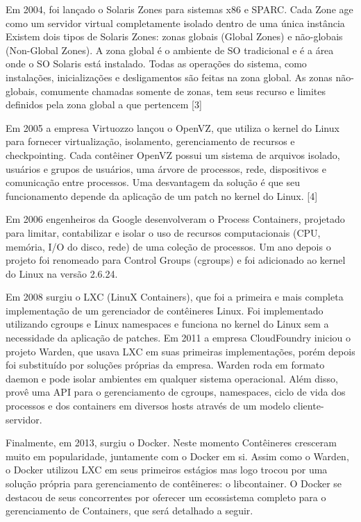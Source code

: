 \documentclass[]{politex}
\begin{document}
	Em 2004, foi lançado o Solaris Zones para sistemas x86 e SPARC. Cada Zone age como um servidor virtual completamente isolado dentro de uma única instância Existem dois tipos de Solaris Zones: zonas globais (Global Zones) e não-globais (Non-Global Zones). A zona global é o ambiente de SO tradicional e é a área onde o SO Solaris está instalado. Todas as operações do sistema, como instalações, inicializações e desligamentos são feitas na zona global. As zonas não-globais, comumente chamadas somente de zonas, tem seus recurso e limites definidos pela zona global a que pertencem  [3]

	Em 2005 a empresa Virtuozzo lançou o OpenVZ, que utiliza o kernel do Linux para fornecer virtualização, isolamento, gerenciamento de recursos e checkpointing. Cada contêiner OpenVZ possui um sistema de arquivos isolado, usuários e grupos de usuários, uma árvore de processos, rede, dispositivos e comunicação entre processos. Uma desvantagem da solução é que seu funcionamento depende da aplicação de um patch no kernel do Linux. [4]

	Em 2006 engenheiros da Google desenvolveram o Process Containers, projetado para limitar, contabilizar e isolar o uso de recursos computacionais (CPU, memória, I/O do disco, rede) de uma coleção de processos. Um ano depois o projeto foi renomeado para Control Groups (cgroups) e foi adicionado ao kernel do Linux na versão 2.6.24.

	Em 2008 surgiu o LXC (LinuX Containers), que foi a primeira e mais completa implementação de um gerenciador de contêineres Linux. Foi implementado utilizando cgroups e Linux namespaces e funciona no kernel do Linux sem a necessidade da aplicação de patches.
	Em 2011 a empresa CloudFoundry iniciou o projeto Warden, que usava LXC em suas primeiras implementações, porém depois foi substituído por soluções próprias da empresa. Warden roda em formato daemon e pode isolar ambientes em qualquer sistema operacional. Além disso, provê uma API para o gerenciamento de cgroups, namespaces, ciclo de vida dos processos e dos containers em diversos hosts através de um modelo cliente-servidor.

	Finalmente, em 2013, surgiu o Docker. Neste momento Contêineres cresceram muito em popularidade, juntamente com o Docker em si.
	Assim como o Warden, o Docker utilizou LXC em seus primeiros estágios mas logo trocou por uma solução própria para gerenciamento de contêineres: o libcontainer.
	O Docker se destacou de seus concorrentes por oferecer um ecossistema completo para o gerenciamento de Containers, que será detalhado a seguir.
	
\end{document}
